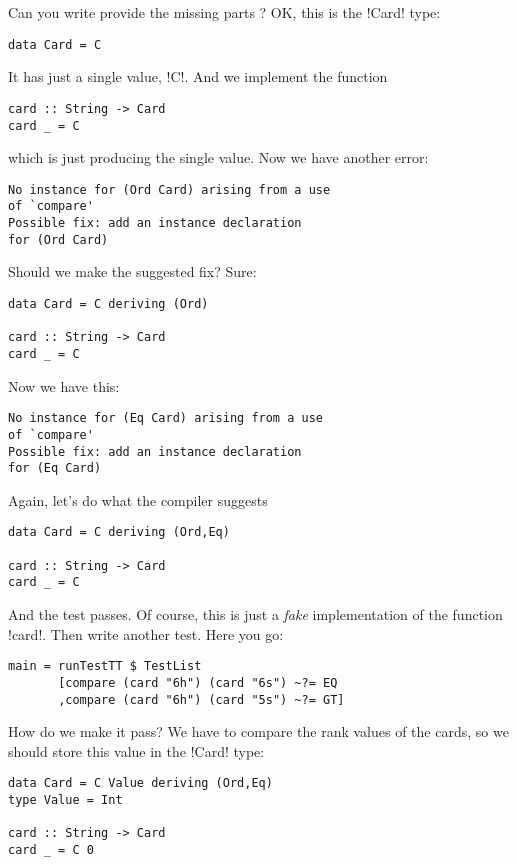 Can you write provide the missing parts ?
\lhA \error OK, this is the \il!Card! type:
\begin{lstlisting}[frame=single]
data Card = C 
\end{lstlisting}
It has just a single value, \il!C!. And we implement the function
\begin{lstlisting}[frame=single]
card :: String -> Card
card _ = C
\end{lstlisting}
which is just producing the single value.
\lhN \error Now we have another error:
\begin{small}
\begin{verbatim}
No instance for (Ord Card) arising from a use 
of `compare' 
Possible fix: add an instance declaration 
for (Ord Card)
\end{verbatim}
\end{small}
Should we make the suggested fix?
\lhA \error Sure:
\begin{lstlisting}[frame=single]
data Card = C deriving (Ord)

card :: String -> Card
card _ = C
\end{lstlisting}
\lhN \error Now we have this:
\begin{small}
\begin{verbatim}
No instance for (Eq Card) arising from a use 
of `compare' 
Possible fix: add an instance declaration
for (Eq Card)
\end{verbatim}
\end{small}
\hspace*{\fill} 
\lhA \error Again, let's do what the compiler suggests 
\begin{lstlisting}[frame=single]
data Card = C deriving (Ord,Eq)

card :: String -> Card
card _ = C
\end{lstlisting}
\success And the test passes.
\lhN Of course, this is just a \emph{fake} implementation of the function \il!card!.
\lhA Then write another test.
\lhN Here you go:
\begin{lstlisting}[frame=single]
main = runTestTT $ TestList 
       [compare (card "6h") (card "6s") ~?= EQ
       ,compare (card "6h") (card "5s") ~?= GT]
\end{lstlisting} %
How do we make it pass?
\lhA \error We have to compare the rank values of the cards, so we should store this value in the \il!Card! type:
\begin{lstlisting}[frame=single]
data Card = C Value deriving (Ord,Eq)
type Value = Int

card :: String -> Card
card _ = C 0
\end{lstlisting}
